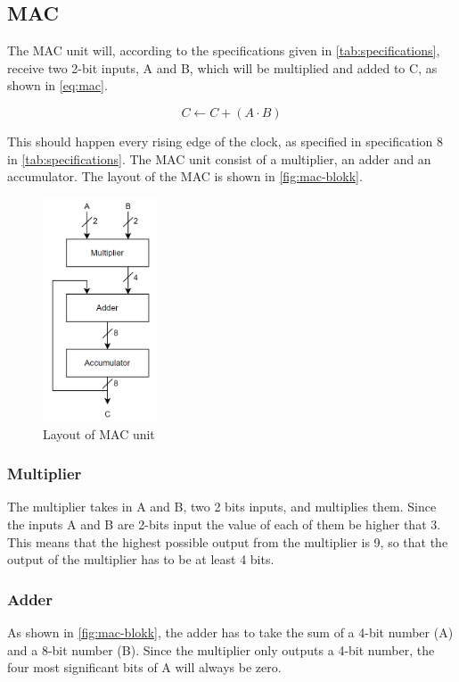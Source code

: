 \subsection{MAC}
\label{subsec:MAC_theory}

The MAC unit will, according to the specifications given in \autoref{tab:specifications}, receive two 2-bit inputs, A and B, which will be multiplied and added to C, as shown in \autoref{eq:mac}. 

\begin{equation}
    \label{eq:mac}
    C \leftarrow C + (A \cdot B)
\end{equation}

 This should happen every rising edge of the clock, as specified in specification 8 in \autoref{tab:specifications}. The MAC unit consist of a multiplier, an adder and an accumulator. The layout of the MAC is shown in \autoref{fig:mac-blokk}. 

\begin{figure}[htpb]
    \centering
    \includegraphics[width=0.3\textwidth]{Figures/mac-blokk.png}
    \caption{Layout of MAC unit}
    \label{fig:mac-blokk}
\end{figure}


\subsubsection{Multiplier}
The multiplier takes in A and B, two 2 bits inputs, and multiplies them. Since the inputs A and B are 2-bits input the value of each of them be higher that 3. This means that the highest possible output from the multiplier is 9, so that the output of the multiplier has to be at least 4 bits. 

\subsubsection{Adder}
As shown in \autoref{fig:mac-blokk}, the adder has to take the sum of a 4-bit number (A) and a 8-bit number (B). Since the multiplier only outputs a 4-bit number, the four most significant bits of A will always be zero. 

